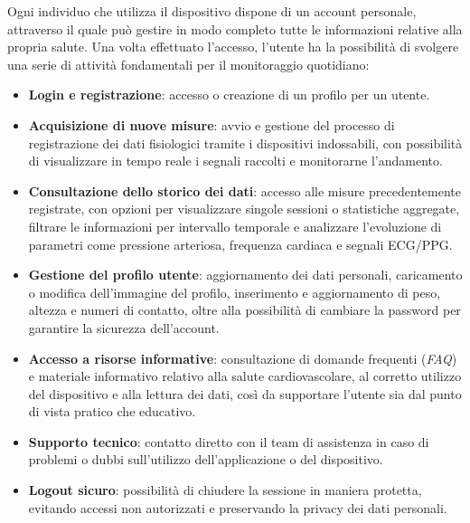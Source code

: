 \documentclass[11pt,a4paper]{article}
\begin{document}
Ogni individuo che utilizza il dispositivo dispone di un account personale, attraverso il quale può gestire in modo completo tutte le informazioni relative alla propria salute. Una volta effettuato l’accesso, l’utente ha la possibilità di svolgere una serie di attività fondamentali per il monitoraggio quotidiano:
\begin{itemize}
    \item \textbf{Login e registrazione}: accesso o creazione di un profilo per un utente.
    \item \textbf{Acquisizione di nuove misure}: avvio e gestione del processo di registrazione dei dati fisiologici tramite i dispositivi indossabili, con possibilità di visualizzare in tempo reale i segnali raccolti e monitorarne l’andamento.
    \item \textbf{Consultazione dello storico dei dati}: accesso alle misure precedentemente registrate, con opzioni per visualizzare singole sessioni o statistiche aggregate, filtrare le informazioni per intervallo temporale e analizzare l’evoluzione di parametri come pressione arteriosa, frequenza cardiaca e segnali ECG/PPG.
    \item \textbf{Gestione del profilo utente}: aggiornamento dei dati personali, caricamento o modifica dell’immagine del profilo, inserimento e aggiornamento di peso, altezza e numeri di contatto, oltre alla possibilità di cambiare la password per garantire la sicurezza dell’account.
    \item \textbf{Accesso a risorse informative}: consultazione di domande frequenti (\textit{FAQ}) e materiale informativo relativo alla salute cardiovascolare, al corretto utilizzo del dispositivo e alla lettura dei dati, così da supportare l’utente sia dal punto di vista pratico che educativo.
    \item \textbf{Supporto tecnico}: contatto diretto con il team di assistenza in caso di problemi o dubbi sull’utilizzo dell’applicazione o del dispositivo.
    \item \textbf{Logout sicuro}: possibilità di chiudere la sessione in maniera protetta, evitando accessi non autorizzati e preservando la privacy dei dati personali.
\end{itemize}
\end{document}
